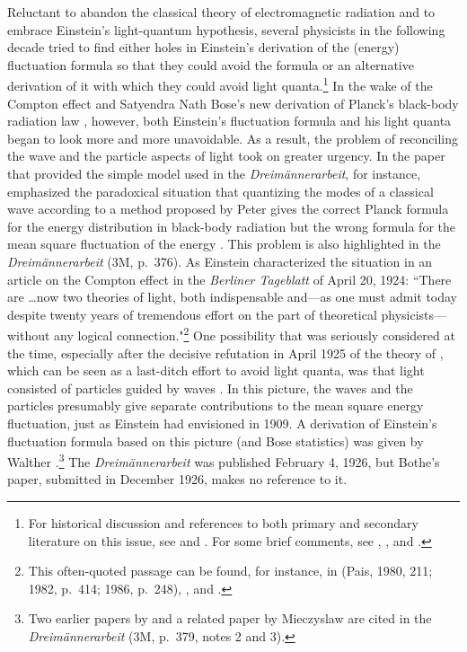 \documentclass{elsart}
\begin{document}
Reluctant to abandon the classical theory of electromagnetic radiation and to embrace Einstein's light-quantum hypothesis, several physicists in the following decade tried to find either holes in Einstein's derivation of the (energy) fluctuation formula so that they could avoid the formula or an alternative derivation of it with which they could avoid light quanta.\footnote{\label{kojevnikov}
For historical discussion and references to both primary and secondary literature on this issue, see 
\citep{Bach 1989} and \citep{Kojevnikov 1990}. For some brief comments, see \citep[p.\ 642, note 2]{Jordan 1927b}, \citep[p.\ 398, note 1]{Born and Jordan 1930}, and \citep[p.\ 220]{Jordan 1936}.} In the wake of the Compton effect \citep{Compton 1923} and Satyendra Nath Bose's new derivation of Planck's black-body radiation law \citep{Bose 1924}, however, both Einstein's fluctuation formula and his light quanta began to look more and more unavoidable. As a result, the problem of reconciling the wave and the particle aspects of light took on greater urgency. In the paper that provided the simple model used in the {\it Dreim\"annerarbeit}, for instance, \citet{Ehrenfest 1925a} emphasized the paradoxical situation that quantizing the modes of a classical wave according to a method proposed by Peter \citet{Debye 1910} gives the correct Planck formula for the energy distribution  in black-body radiation but the wrong formula for the mean square fluctuation of the energy \citep[p.\ 379]{Stachel 1986}. This problem is also highlighted in the {\it Dreim\"annerarbeit} (3M, p.\ 376). As Einstein characterized the situation in an article on the Compton effect in the  {\it Berliner Tageblatt} of April 20, 1924:  ``There are \ldots now two theories of light, both indispensable and---as one must admit today despite twenty years of tremendous effort on the part of theoretical physicists---without any logical connection."\footnote{This often-quoted passage can be found, for instance, in (Pais, 1980, 211; 1982, p.\ 414; 1986, p.\ 248), \citep[p.\ 182]{Klein 1980}, and \citep[p.\ 182]{Bach 1989}.} One possibility that was seriously considered at the time, especially after the decisive refutation  in April 1925 of the theory of \citet{BKS}, which can be seen as a last-ditch effort to avoid light quanta, was that light consisted of particles guided by waves \citep[sec.\ 4.2]{Duncan and Janssen}. In this picture, the waves and the particles presumably give separate contributions to the mean square energy fluctuation, just as Einstein had envisioned in 1909. A derivation of Einstein's fluctuation formula based on this picture (and Bose statistics) was given by Walther \citet{Bothe 1927}.\footnote{Two earlier papers by \citet{Bothe 1923, Bothe 1924} and a related paper by Mieczyslaw \citet{Wolfke 1921} are cited in the {\it Dreim\"annerarbeit} (3M, p.\ 379, notes 2 and 3).} The {\it Dreim\"annerarbeit} was published February 4, 1926, but Bothe's paper, submitted in December 1926, makes no reference to it.
\end{document}

